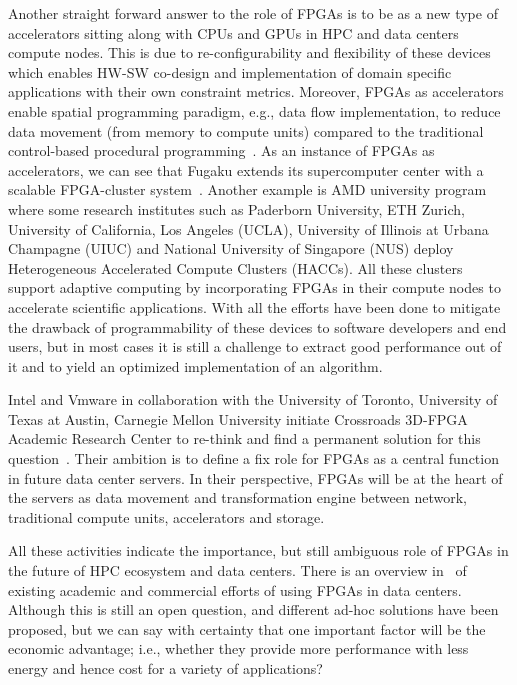Another straight forward answer to the role of FPGAs is to be as a new type of accelerators sitting along with CPUs and GPUs in HPC and data centers compute nodes. This is due to re-configurability and flexibility of these devices which enables HW-SW co-design and implementation of domain specific applications with their own constraint metrics. Moreover, FPGAs as accelerators enable spatial programming paradigm, e.g., data flow implementation, to reduce data movement (from memory to compute units) compared to the traditional control-based procedural programming~\cite{Licht2022PythonDesign}. 
As an instance of FPGAs as accelerators, we can see that Fugaku extends its supercomputer center with a scalable FPGA-cluster system~\cite{Sano2023ESSPER:Fugaku}. 
Another example is AMD university program~\cite{amd_hacc} where some research institutes such as Paderborn University, ETH Zurich, University of California, Los Angeles (UCLA), University of Illinois at Urbana Champagne (UIUC) and National University of Singapore (NUS) deploy Heterogeneous Accelerated Compute Clusters (HACCs).  All these clusters support adaptive computing by incorporating FPGAs in their compute nodes to accelerate scientific applications.   
With all the efforts have been done to mitigate the drawback of programmability of these devices to software developers and end users, but in most cases it is still a challenge to extract good performance out of it and to yield an optimized implementation of an algorithm.

Intel and Vmware in collaboration with the University of Toronto, University of Texas at Austin, Carnegie Mellon University initiate Crossroads 3D-FPGA Academic Research Center to re-think and find a permanent solution for this question~\cite{crossroads_fpga}. Their ambition is to define a fix role for FPGAs as a central function in future data center servers. In their perspective, FPGAs will be at the heart of the servers as data movement and transformation engine between network, traditional compute units, accelerators and storage.

All these activities indicate the importance, but still ambiguous role of FPGAs in the future of HPC ecosystem and data centers. There is an overview in~\cite{Bobda2022TheCloud} of existing academic and commercial efforts of using FPGAs in data centers. Although this is still an open question, and different ad-hoc solutions have been proposed, but we can say with certainty that one important factor will be the economic advantage; i.e., whether they provide more performance with less energy and hence cost for a variety of applications?

